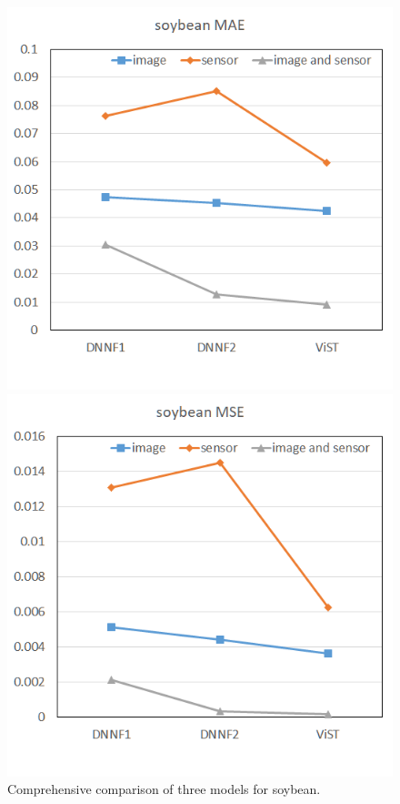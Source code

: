 \documentclass[acmsmall,manuscript, screen, review]{acmart}
\begin{document}
\begin{figure}[htbp]
  \centering
  \begin{minipage}{0.49\linewidth}
    \centering
    \includegraphics[width=\linewidth]{pic/comprehensive_soybean_mae.png}
  \end{minipage}
  \centering
  \begin{minipage}{0.49\linewidth}
    \centering
    \includegraphics[width=\linewidth]{pic/comprehensive_soybean_mse.png}
  \end{minipage}

  \caption{Comprehensive comparison of three models for soybean. \label{comprehensive_soybean}}
\end{figure}
\end{document}
